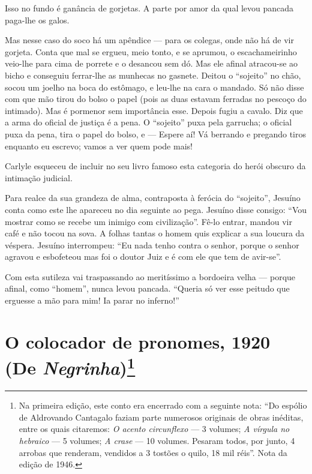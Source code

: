 Isso no fundo é ganância de gorjetas. A parte por amor da qual levou
pancada paga-lhe os galos.

Mas nesse caso do soco há um apêndice --- para os colegas, onde não há
de vir gorjeta. Conta que mal se ergueu, meio tonto, e se aprumou, o
escachameirinho veio-lhe para cima de porrete e o desancou sem dó. Mas
ele afinal atracou-se ao bicho e conseguiu ferrar-lhe as munhecas no
gasnete. Deitou o ``sojeito'' no chão, socou um joelho na boca do
estômago, e leu-lhe na cara o mandado. Só não disse com que mão tirou do
bolso o papel (pois as duas estavam ferradas no pescoço do intimado).
Mas é pormenor sem importância esse. Depois fugiu a cavalo. Diz que a
arma do oficial de justiça é a pena. O ``sojeito'' puxa pela garrucha; o
oficial puxa da pena, tira o papel do bolso, e --- Espere aí! Vá
berrando e pregando tiros enquanto eu escrevo; vamos a ver quem pode
mais!

Carlyle esqueceu de incluir no seu livro famoso esta categoria do herói
obscuro da intimação judicial.

Para realce da sua grandeza de alma, contraposta à ferócia do
``sojeito'', Jesuíno conta como este lhe apareceu no dia seguinte ao
pega. Jesuíno disse consigo: ``Vou mostrar como se recebe um inimigo com
civilização''. Fê-lo entrar, mandou vir café e não tocou na sova. A
folhas tantas o homem quis explicar a sua loucura da véspera. Jesuíno
interrompeu: ``Eu nada tenho contra o senhor, porque o senhor agravou e
esbofeteou mas foi o doutor Juiz e é com ele que tem de avir-se''.

Com esta sutileza vai traspassando ao meritíssimo a bordoeira velha ---
porque afinal, como ``homem'', nunca levou pancada. ``Queria só ver esse
peitudo que erguesse a mão para mim! Ia parar no inferno!''

\chapter[O colocador de pronomes, 1920 (De \emph{Negrinha})]{O colocador de pronomes, 1920 (De \emph{Negrinha})\footnote{Na primeira edição, este conto era encerrado
  com a seguinte nota: ``Do espólio de Aldrovando Cantagalo faziam parte
  numerosos originais de obras inéditas, entre os quais citaremos:
  \emph{O acento circunflexo} --- 3 volumes; \emph{A vírgula no
  hebraico} --- 5 volumes; \emph{A crase} --- 10 volumes. Pesaram todos,
  por junto, 4 arrobas que renderam, vendidos a 3 tostões o quilo, 18
  mil réis''. Nota da edição de 1946.}}


